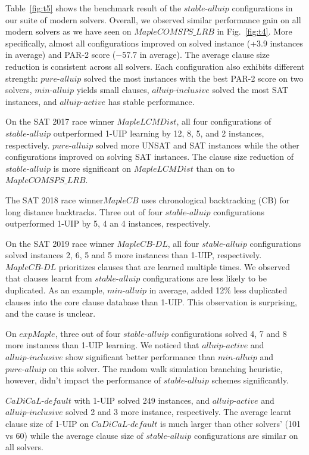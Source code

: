 \documentclass[runningheads]{llncs}
\newcommand{\oneuip}{1-UIP\xspace}
\newcommand{\stablealluip}{\textit{stable-alluip}\xspace}
\newcommand{\allUipPure}{\textit{pure-alluip}\xspace}
\newcommand{\allUipMin}{\textit{min-alluip}\xspace}
\newcommand{\allUipAct}{\textit{alluip-active}}
\newcommand{\allUipIn}{\textit{alluip-inclusive}}
\newcommand{\MapleBase}{\textit{MapleCOMSPS\_LRB}}
\newcommand{\MapleSeven}{\textit{MapleLCMDist}}
\newcommand{\MapleNineShort}{\textit{MapleCB-DL} }
\newcommand{\expSATShort}{\textit{expMaple} }
\newcommand{\defaultcadical}{\textit{CaDiCaL-default}}
\newcommand{\MapleEightShort}{\textit{MapleCB}}
\begin{document}
Table~\ref{fig:t5} shows the benchmark result of the $\stablealluip$
configurations in our suite of modern solvers. Overall, we observed
similar performance gain on all modern solvers as we have seen on
$\MapleBase$ in Fig.~\ref{fig:t4}. More specifically, almost all
configurations improved on solved instance (+3.9 instances in average)
and PAR-2 score ($-$57.7 in average).  The average clause size
reduction is consistent across all solvers. Each configuration also
exhibits different strength: $\allUipPure$ solved the most instances
with the best PAR-2 score on two solvers, $\allUipMin$ yields small
clauses, $\allUipIn$ solved the most SAT instances, and $\allUipAct$
has stable performance.


On the SAT 2017 race winner $\MapleSeven$, all four configurations of
$\stablealluip$ outperformed \oneuip learning by 12, 8, 5, and 2 instances,
respectively. $\allUipPure$ solved more UNSAT and SAT instances while
the other configurations improved on solving SAT instances. The clause
size reduction of $\stablealluip$ is more significant on $\MapleSeven$
than on to $\MapleBase$.

The SAT 2018 race winner$\MapleEightShort$ uses chronological
backtracking (CB) for long distance backtracks. Three out of four
$\stablealluip$ configurations outperformed \oneuip by 5, 4 an 4 instances,
respectively.

On the SAT 2019 race winner $\MapleNineShort$, all four
$\stablealluip$ configurations solved instances 2, 6, 5 and 5 more instances
than \oneuip, respectively. $\MapleNineShort$ prioritizes clauses that
are learned multiple times. We observed that clauses learnt from
$\stablealluip$ configurations are less likely to be duplicated. As an
example, $\allUipMin$ in average, added 12\% less duplicated clauses
into the core clause database than \oneuip. This observation is
surprising, and the cause is unclear.


On $\expSATShort$, three out of four $\stablealluip$ configurations solved
4, 7 and 8 more instances than \oneuip learning. We noticed that
$\allUipAct$ and $\allUipIn$ show significant better performance than
$\allUipMin$ and $\allUipPure$ on this solver. The random walk
simulation branching heuristic, however, didn't impact the performance
of $\stablealluip$ schemes significantly.

$\defaultcadical$ with \oneuip solved 249 instances,   
and $\allUipAct$ and $\allUipIn$ solved 2 and 3 more instance, respectively.  
The average learnt clause size of \oneuip on 
$\defaultcadical$ is much larger than other solvers' (101 vs 60) 
while the average clause size of $\stablealluip$ configurations are similar on all solvers.
\end{document}
